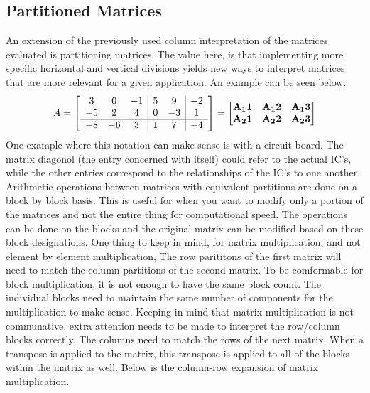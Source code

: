 \documentclass[12pt]{article}
\begin{document}
\subsection{Partitioned Matrices}
An extension of the previously used column interpretation of the matrices evaluated is partitioning matrices. The value here, is that implementing more specific horizontal %
and vertical divisions yields new ways to interpret matrices that are more relevant for a given application. An example can be seen below.
\newline
\newline
$$
A=\left[\begin{array}{c c c | c c | c}
    3 & 0 & -1 & 5 & 9 & -2 \\
    -5 & 2 & 4 & 0  & -3 & 1 \\
    \hline
    -8 & -6 & 3 & 1 & 7 & -4
\end{array}\right]=
\begin{bmatrix}
    \mathbf{A_11} & \mathbf{A_12} & \mathbf{A_13} \\
    \mathbf{A_21} & \mathbf{A_22} & \mathbf{A_23}
\end{bmatrix}
$$
\newline
\newline
One example where this notation can make sense is with a circuit board. The matrix diagonol (the entry concerned with itself) could refer to the actual IC's, while the %
other entries correspond to the relationships of the IC's to one another. Arithmetic operations between matrices with equivalent partitions are done on a block by block %
basis. This is useful for when you want to modify only a portion of the matrices and not the entire thing for computational speed. The operations can be done on the blocks %
and the original matrix can be modified based on these block designations. One thing to keep in mind, for matrix multiplication, and not element by element multiplication, %
The row parititons of the first matrix will need to match the column partitions of the second matrix. To be comformable for block multiplication, it is not enough to have %
the same block count. The individual blocks need to maintain the same number of components for the multiplication to make sense. Keeping in mind that matrix multiplication %
is not communative, extra attention needs to be made to interpret the row/column blocks correctly. The columns need to match the rows of the next matrix. When a transpose %
is applied to the matrix, this transpose is applied to all of the blocks within the matrix as well. %
Below is the column-row expansion of matrix multiplication.
\end{document}

